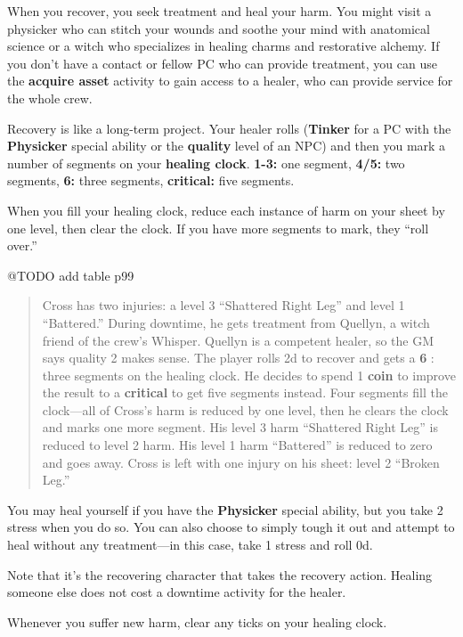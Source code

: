 \documentclass[11pt,fleqn,a5paper]{book}
\newcommand{\gameterm}[1]{\textbf{#1}}
\begin{document}
When you recover, you seek treatment and heal your harm. You might visit a physicker who can stitch your wounds and soothe your mind with anatomical science or a witch who specializes in healing charms and restorative alchemy. If you don’t have a contact or fellow PC who can provide treatment, you can use the \textbf{acquire asset} activity to gain access to a healer, who can provide service for the whole crew.

Recovery is like a long-term project. Your healer rolls (\gameterm{Tinker}  for a PC with the \gameterm{Physicker}  special ability or the \textbf{quality} level of an NPC) and then you mark a number of segments on your \textbf{healing clock}. \gameterm{1-3:}  one segment, \gameterm{4/5:}  two segments, \gameterm{6:}  three segments, \gameterm{critical:}  five segments.

When you fill your healing clock, reduce each instance of harm on your sheet by one level, then clear the clock. If you have more segments to mark, they “roll over.”

@TODO add table p99

\begin{quote}
	Cross has two injuries: a level 3 “Shattered Right Leg” and level 1 “Battered.” During downtime, he gets treatment from Quellyn, a witch friend of the crew’s Whisper. Quellyn is a competent healer, so the GM says quality 2 makes sense. The player rolls 2d to recover and gets a \gameterm{6} : three segments on the healing clock. He decides to spend 1 \gameterm{coin}  to improve the result to a \gameterm{critical}  to get five segments instead. Four segments fill the clock---all of Cross’s harm is reduced by one level, then he clears the clock and marks one more segment. His level 3 harm “Shattered Right Leg” is reduced to level 2 harm. His level 1 harm “Battered” is reduced to zero and goes away. Cross is left with one injury on his sheet: level 2 “Broken Leg.”
\end{quote} 

You may heal yourself if you have the \gameterm{Physicker}  special ability, but you take 2 stress when you do so. You can also choose to simply tough it out and attempt to heal without any treatment---in this case, take 1 stress and roll 0d.

Note that it’s the recovering character that takes the recovery action. Healing someone else does not cost a downtime activity for the healer.

Whenever you suffer new harm, clear any ticks on your healing clock.
\end{document}
